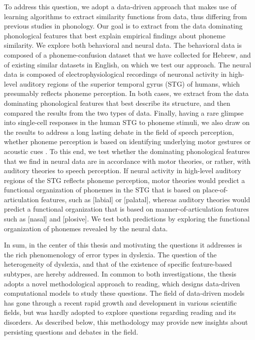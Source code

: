 To address this question, we adopt a data-driven approach that makes use of learning algorithms to extract similarity functions from data, thus differing from previous studies in phonology. Our goal is to extract from the data dominating phonological features that best explain empirical findings about phoneme similarity. We explore both behavioral and neural data. The behavioral data is composed of a phoneme-confusion dataset that we have collected for Hebrew, and of existing similar datasets in English, on which we test our approach. The neural data is composed of electrophysiological recordings of neuronal activity in high-level auditory regions of the superior temporal gyrus (STG) of humans, which presumably reflects phoneme perception. In both cases, we extract from the data dominating phonological features that best describe its structure, and then compared the results from the two types of data. Finally, having a rare glimpse into single-cell responses in the human STG to phoneme stimuli, we also draw on the results to address a long lasting debate in the field of speech perception, whether phoneme perception is based on identifying underlying motor gestures \citep{liberman1967perception, liberman1985motor} or acoustic cues \citep{stevens1972quantal, stevens1989quantal}. To this end, we test whether the dominating phonological features that we find in neural data are in accordance with motor theories, or rather, with auditory theories to speech perception. If neural activity in high-level auditory regions of the STG reflects phoneme perception, motor theories would predict a functional organization of phonemes in the STG that is based on place-of-articulation features, such as [labial] or [palatal], whereas auditory theories would predict a functional organization that is based on manner-of-articulation features such as [nasal] and [plosive]. We test both predictions by exploring the functional organization of phonemes revealed by the neural data.  

In sum, in the center of this thesis and motivating the questions it addresses is the rich phenomenology of error types in dyslexia. The question of the heterogeneity of dyslexia, and that of the existence of specific feature-based subtypes, are hereby addressed. In common to both investigations, the thesis adopts a novel methodological approach to reading, which designs data-driven computational models to study these questions. The field of data-driven models has gone through a recent rapid growth and development in various scientific fields, but was hardly adopted to explore questions regarding reading and its disorders. As described below, this methodology may provide new insights about persisting questions and debates in the field.

